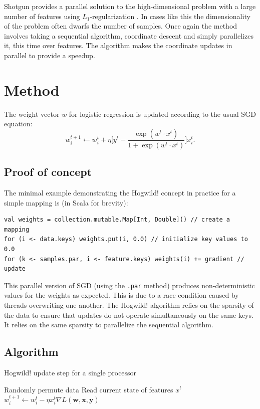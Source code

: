 \documentclass{article} %
\begin{document}
Shotgun provides a parallel solution to the high-dimensional problem with a large number of features using $L_1$-regularization \cite{ng2004feature}. In cases like this the dimensionality of the problem often dwarfs the number of samples. Once again the method involves taking a sequential algorithm, coordinate descent and simply parallelizes it, this time over features. The algorithm makes the coordinate updates in parallel to provide a speedup.

\section{Method}
The weight vector $w$ for logistic regression is updated according to the usual SGD equation:
\begin{equation}
w_i^{t+1} \leftarrow w_i^t + \eta \bigg[y^t - \frac{\exp{(w^t \cdot x^t)}}{1 + \exp{(w^t \cdot x^t)}} \bigg]x_i^t.
\end{equation}

\subsection{Proof of concept}
The minimal example demonstrating the Hogwild! concept in practice for a simple mapping is (in Scala for brevity):
\begin{lstlisting}
val weights = collection.mutable.Map[Int, Double]() // create a mapping
for (i <- data.keys) weights.put(i, 0.0) // initialize key values to 0.0
for (k <- samples.par, i <- feature.keys) weights(i) += gradient // update
\end{lstlisting}
This parallel version of SGD (using the \verb+.par+ method) produces non-deterministic values for the weights as expected. This is due to a race condition caused by threads overwriting one another. The Hogwild! algorithm relies on the sparsity of the data to ensure that updates do not operate simultaneously on the same keys. It relies on the same sparsity to parallelize the sequential algorithm.

\subsection{Algorithm}

\begin{algorithm}
  \caption{Hogwild! update step for a single processor}

  \begin{algorithmic}
  \Loop
  \State Randomly permute data
  \State Read current state of features $x^t$
  \State $w^{t+1}_i \leftarrow w_i^t - \eta x_i^t \nabla L(\mathbf{w}, \mathbf{x}, \mathbf{y})$
  \EndFor
  \EndLoop
  \end{algorithmic}
  \label{alg1}
\end{algorithm}
\end{document}
